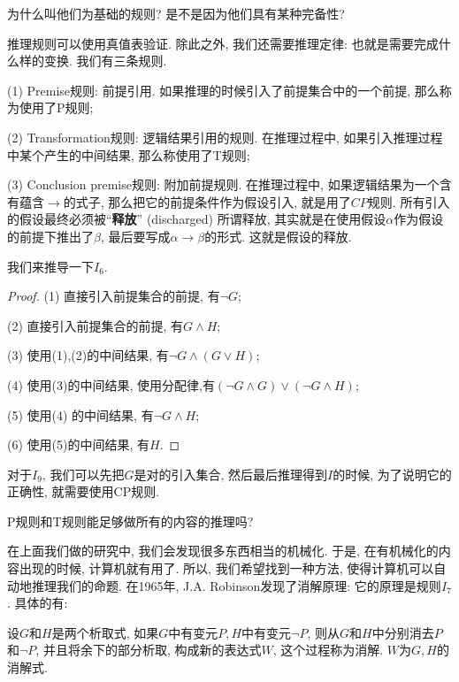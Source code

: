 \begin{bonus}
	为什么叫他们为基础的规则? 是不是因为他们具有某种完备性? 
\end{bonus}


推理规则可以使用真值表验证. 除此之外, 我们还需要推理定律: 也就是需要完成什么样的变换. 我们有三条规则.


(1) Premise规则: 前提引用. 如果推理的时候引入了前提集合中的一个前提, 那么称为使用了P规则;

(2) Transformation规则: 逻辑结果引用的规则. 在推理过程中, 如果引入推理过程中某个产生的中间结果, 那么称使用了T规则;

(3) Conclusion premise规则: 附加前提规则. 在推理过程中, 如果逻辑结果为一个含有蕴含$\rightarrow$的式子, 那么把它的前提条件作为假设引入, 就是用了$CP$规则. 所有引入的假设最终必须被``{\bf 释放}'' (discharged)
    所谓释放, 其实就是在使用假设$\alpha$作为假设的前提下推出了$\beta$, 最后要写成$\alpha \rightarrow \beta$的形式. 这就是假设的释放. 

我们来推导一下$I_6$. 

\begin{proof}
	(1) 直接引入前提集合的前提, 有$\lnot G$;
	
	(2) 直接引入前提集合的前提, 有$G \land H$;
	
	(3) 使用(1),(2)的中间结果, 有$\lnot G \land (G\lor H)$;
	
	(4) 使用(3)的中间结果, 使用分配律,有$(\lnot G \land G)\lor (\lnot G \land H)$;
	
	(5) 使用(4) 的中间结果, 有$\lnot G \land H$;
	
	(6) 使用(5)的中间结果, 有$H$. 
\end{proof}

对于$I_9$, 我们可以先把$G$是对的引入集合, 然后最后推理得到$I$的时候, 为了说明它的正确性, 就需要使用CP规则. 

\begin{bonus}
	P规则和T规则能足够做所有的内容的推理吗?
\end{bonus}

在上面我们做的研究中, 我们会发现很多东西相当的机械化. 于是, 在有机械化的内容出现的时候, 计算机就有用了. 所以, 我们希望找到一种方法, 使得计算机可以自动地推理我们的命题. 在1965年, J.A. Robinson发现了消解原理: 它的原理是规则$I_7$. 具体的有: 

\begin{definition}[消解与消解式]
	设$G$和$H$是两个析取式, 如果$G$中有变元$P,H$中有变元$\lnot P$, 则从$G$和$H$中分别消去$P$和$\lnot P$, 并且将余下的部分析取, 构成新的表达式$W$, 这个过程称为消解. $W$为$G,H$的消解式. 
\end{definition}

